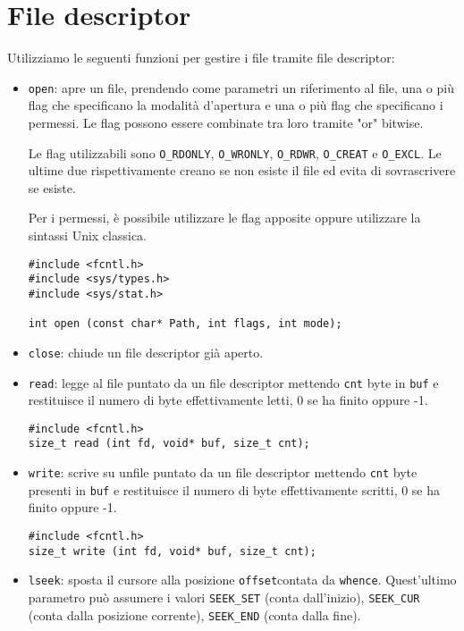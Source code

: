 \documentclass[11pt]{article}
\begin{document}
\section{File descriptor}

Utilizziamo le seguenti funzioni per gestire i file tramite file descriptor:

\begin{itemize}
\item \verb|open|: apre un file, prendendo come parametri un riferimento al file, una o più flag che specificano la modalità d'apertura e una o più flag che specificano i permessi. Le flag possono essere combinate tra loro tramite "or" bitwise.

Le flag utilizzabili sono \verb|O_RDONLY|, \verb|O_WRONLY|, \verb|O_RDWR|, \verb|O_CREAT| e \verb|O_EXCL|. Le ultime due rispettivamente creano se non esiste il file ed evita di sovrascrivere se esiste.

Per i permessi, è possibile utilizzare le flag apposite oppure utilizzare la sintassi Unix classica.

\begin{verbatim}
#include <fcntl.h>
#include <sys/types.h>
#include <sys/stat.h>

int open (const char* Path, int flags, int mode);
\end{verbatim}

\item \verb|close|: chiude un file descriptor già aperto.
\item \verb|read|: legge al file puntato da un file descriptor mettendo \verb|cnt| byte in \verb|buf| e restituisce il numero di byte effettivamente letti, 0 se ha finito oppure -1.

\begin{verbatim}
#include <fcntl.h>
size_t read (int fd, void* buf, size_t cnt);
\end{verbatim}

\item \verb|write|: scrive su unfile puntato da un file descriptor mettendo \verb|cnt| byte presenti in \verb|buf| e restituisce il numero di byte effettivamente scritti, 0 se ha finito oppure -1.

\begin{verbatim}
#include <fcntl.h>
size_t write (int fd, void* buf, size_t cnt);
\end{verbatim}

\item \verb|lseek|: sposta il cursore alla posizione \verb|offset|contata da \verb|whence|. Quest'ultimo parametro può assumere i valori \verb|SEEK_SET| (conta dall'inizio), \verb|SEEK_CUR| (conta dalla posizione corrente), \verb|SEEK_END| (conta dalla fine).


\end{itemize}
\end{document}
